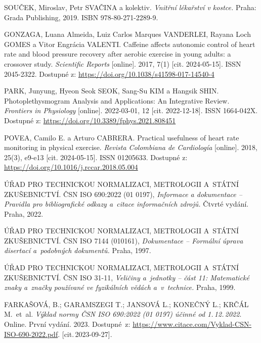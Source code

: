 \begin{thebibliography}{99}
		SOUČEK, Miroslav, Petr SVAČINA a kolektiv.
		\emph{Vnitřní lékařství v kostce.}
		Praha: Grada Publishing, 2019.
		ISBN 978-80-271-2289-9.

		GONZAGA, Luana Almeida, Luiz Carlos Marques VANDERLEI, Rayana Loch GOMES a Vitor Engrácia VALENTI.
		Caffeine affects autonomic control of heart rate and blood pressure recovery after aerobic exercise in young adults: a crossover study.
		\emph{Scientific Reports} [online].
		2017, 7(1) [cit. 2024-05-15].
		ISSN 2045-2322.
		Dostupné z: \url{https://doi.org/10.1038/s41598-017-14540-4}

		PARK, Junyung, Hyeon Seok SEOK, Sang-Su KIM a Hangsik SHIN.
		Photoplethysmogram Analysis and Applications: An Integrative Review.
		\emph{Frontiers in Physiology} [online].
		2022-03-01, 12 [cit. 2022-12-18].
		ISSN 1664-042X.
		Dostupné z: \url{https://doi.org/10.3389/fphys.2021.808451}

		POVEA, Camilo E. a Arturo CABRERA.
		Practical usefulness of heart rate monitoring in physical exercise.
		\emph{Revista Colombiana de Cardiología} [online].
		2018, 25(3), e9-e13 [cit. 2024-05-15].
		ISSN 01205633.
		Dostupné z: \url{https://doi.org/10.1016/j.rccar.2018.05.004}


		ÚŘAD PRO TECHNICKOU NORMALIZACI, METROLOGII A~STÁTNÍ ZKUŠEBNICTVÍ.
		ČSN ISO 690:2022 (01 0197), \emph{Informace a dokumentace -- Pravidla pro bibliografické odkazy a~citace informačních zdrojů.}
		Čtvrté vydání. Praha, 2022.

		ÚŘAD PRO TECHNICKOU NORMALIZACI, METROLOGII A~STÁTNÍ ZKUŠEBNICTVÍ.
		ČSN ISO 7144 (010161), \emph{Dokumentace -- Formální úprava disertací a~podobných dokumentů.}
		Praha, 1997.

		ÚŘAD PRO TECHNICKOU NORMALIZACI, METROLOGII A~STÁTNÍ ZKUŠEBNICTVÍ.
		ČSN ISO 31-11, \emph{Veličiny a~jednotky -- část 11: Matematické znaky a~značky používané ve fyzikálních vědách a~v~technice.}
		Praha, 1999.

		FARKAŠOVÁ, B.; GARAMSZEGI T.; JANSOVÁ L.; KONEČNÝ L.; KRČÁL M.\ et~al.
		\emph{Výklad normy ČSN ISO 690:2022 (01 0197) účinné od 1.\,12.\,2022}.
		Online. První vydání. 2023.
		Dostupné~z:
		\url{https://www.citace.com/Vyklad-CSN-ISO-690-2022.pdf}.
		[cit.\,2023-09-27].

\end{thebibliography}


